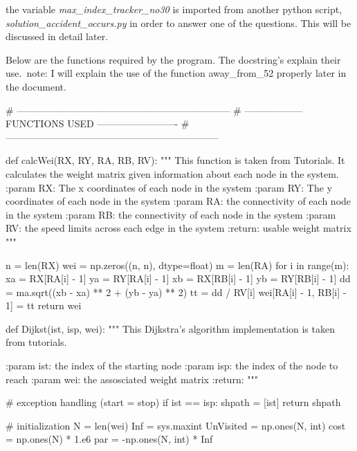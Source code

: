 \documentclass[paper=a4, fontsize=12pt]{scrartcl} %
\numberwithin{equation}{section}       %
\numberwithin{figure}{section}         %
\numberwithin{table}{section}          %
\begin{document}
the variable \textit{max\_index\_tracker\_no30} is imported from another python script, 
\newline
\textit{solution\_accident\_occurs.py} in order to answer one of the questions. This will be discussed in detail later.
\leavevmode
\newline

Below are the functions required by the program. The docstring's explain their use.\
note: I will explain the use of the function away\_from\_52 properly later in the document.

\leavevmode
\newline

\begin{python}
# ------------------------------------------------------------------
# ------------------    FUNCTIONS USED     -------------------------
# ------------------------------------------------------------------

def calcWei(RX, RY, RA, RB, RV):
    """
    This function is taken from Tutorials. It calculates the weight matrix
    given information about each node in the system.
    :param RX: The x coordinates of each node in the system
    :param RY: The y coordinates of each node in the system
    :param RA: the connectivity of each node in the system
    :param RB: the connectivity of each node in the system
    :param RV: the speed limits across each edge in the system
    :return: usable weight matrix
    """

    n = len(RX)
    wei = np.zeros((n, n), dtype=float)
    m = len(RA)
    for i in range(m):
        xa = RX[RA[i] - 1]
        ya = RY[RA[i] - 1]
        xb = RX[RB[i] - 1]
        yb = RY[RB[i] - 1]
        dd = ma.sqrt((xb - xa) ** 2 + (yb - ya) ** 2)
        tt = dd / RV[i]
        wei[RA[i] - 1, RB[i] - 1] = tt
    return wei
    
def Dijkst(ist, isp, wei):
    """
    This Dijkstra's algorithm implementation is taken from tutorials.
    
    :param ist: the index of the starting node
    :param isp: the index of the node to reach
    :param wei: the assosciated weight matrix
    :return: 
    """

    # exception handling (start = stop)
    if ist == isp:
        shpath = [ist]
        return shpath

    # initialization
    N = len(wei)
    Inf = sys.maxint
    UnVisited = np.ones(N, int)
    cost = np.ones(N) * 1.e6
    par = -np.ones(N, int) * Inf


\end{python}
\end{document}
